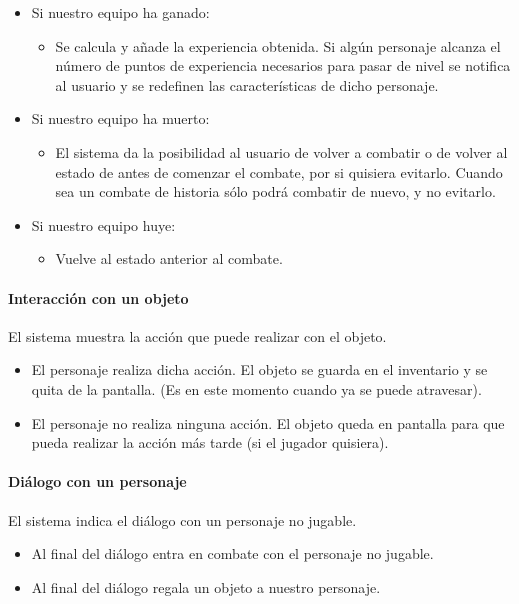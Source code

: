 \documentclass[a4paper,10pt]{article}
\begin{document}
\begin{itemize}
\item Si nuestro equipo ha ganado:
\begin{itemize}
\item Se calcula y añade la experiencia obtenida. Si algún personaje alcanza el número de
  puntos de experiencia necesarios para pasar de nivel se notifica al usuario y se
  redefinen  las características de dicho personaje.
\end{itemize}

\item Si nuestro equipo ha muerto:
\begin{itemize}
\item El sistema da la posibilidad al usuario de volver a combatir o de volver al estado
  de antes de comenzar el combate, por si quisiera evitarlo. Cuando sea un combate de
  historia sólo podrá combatir de nuevo, y no evitarlo.
\end{itemize}

\item Si nuestro equipo huye:
\begin{itemize}
\item Vuelve al estado anterior al combate.
\end{itemize}

\end{itemize}


\paragraph*{Interacción con un objeto}

\noindent El sistema muestra la acción que puede realizar con el objeto.
\begin{itemize}
\item El personaje realiza dicha acción. El objeto se guarda en el inventario y se quita
  de la pantalla. (Es en este momento cuando ya se puede atravesar).
\item El personaje no realiza ninguna acción. El objeto queda en pantalla para que pueda
  realizar la acción más tarde (si el jugador quisiera). 
\end{itemize}

\paragraph*{Diálogo con un personaje}
El sistema indica el diálogo con un personaje no jugable.
\begin{itemize}
\item Al final del diálogo entra en combate con el personaje no jugable.
\item Al final del diálogo regala un objeto a nuestro personaje.
\end{itemize}
\end{document}

